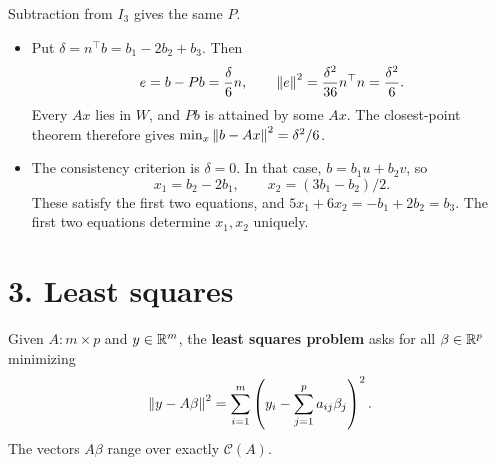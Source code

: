\begin{example}
\begin{itemize}
\[  \]
  Subtraction from \(I_3\) gives the same \(P\).
\end{itemize}
\begin{itemize}
\item Put \(\delta=n^\top b=b_1-2b_2+b_3\). Then
  \[
  e=b-Pb=\frac{\delta}{6}n,\qquad
  \left\lVert e\right\rVert^2=\frac{\delta^2}{36}n^\top n=\frac{\delta^2}{6}.
  \]
  Every \(Ax\) lies in \(W\), and \(Pb\) is attained by some \(Ax\).
  The closest-point theorem therefore gives
  \(\min_x\left\lVert b-Ax\right\rVert^2=\delta^2/6\).
\item The consistency criterion is \(\delta=0\). In that case,
  \(b=b_1u+b_2v\), so
  \[
  x_1=b_2-2b_1,\qquad x_2=(3b_1-b_2)/2.
  \]
  These satisfy the first two equations, and
  \(5x_1+6x_2=-b_1+2b_2=b_3\). The first two equations determine
  \(x_1,x_2\) uniquely.
\end{itemize}
\end{example}

\section*{3. Least squares}

Given \(A:m\times p\) and \(y\in\mathbb R^m\),
the \textbf{least squares problem} asks for all \(\beta\in\mathbb R^p\) minimizing
\[
\left\lVert y-A\beta\right\rVert^2
=\sum_{i=1}^m\left(y_i-\sum_{j=1}^p a_{ij}\beta_j\right)^2.
\]
The vectors \(A\beta\) range over exactly \(\mathcal C(A)\).


